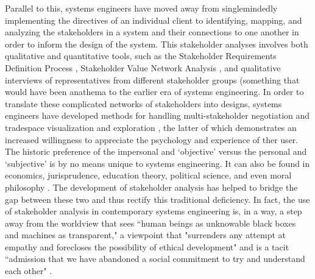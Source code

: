 \documentclass[notitlepage]{article}
\begin{document}
Parallel to this, systems engineers have moved away from singlemindedly implementing the directives of an individual client to identifying, mapping, and analyzing the stakeholders in a system and their connections to one another in order to inform the design of the system. This stakeholder analyses involves both qualitative and quantitative tools, such as the Stakeholder Requirements Definition Process \cite{incoseINCOSESystemsEngineering2015}, Stakeholder Value Network Analysis \cite{fengDependencyStructureMatrix2010a}, and qualitative interviews of representatives from different stakeholder groups (something that would have been anathema to the earlier era of systems engineering. In order to translate these complicated networks of stakeholders into designs, systems engineers have developed methods for handling multi-stakeholder negotiation and \cite{fitzgeraldEffectsEnhancedMultiparty2015,fitzgeraldRecommendationsFramingMultistakeholder2016,weckMULTISTAKEHOLDERSIMULATIONGAMING2012} tradespace visualization and exploration \cite{fitzgeraldEffectsEnhancedMultiparty2015,fitzgeraldRecommendationsFramingMultistakeholder2016,groganInteractiveModelsSystem2015,rossMultiAttributeTradespaceExploration2004,selvavaleroRulebasedSystemArchitecting2012},  the latter of which demonstrates an increased willingness to appreciate the psychology and experience of ther user. The historic preference of the impersonal and `objective' versus the personal and `subjective' is by no means unique to systems engineering. It can also be found in economics, jurisprudence, education theory, political science, and even moral philosophy \cite{banuriModernatizationItsDiscontents1990}. The development of stakeholder analysis has helped to bridge the gap between these two and thus rectify this traditional deficiency. In fact, the use of stakeholder analysis in contemporary systems engineering is, in a way, a step away from the worldview that sees ``human beings as unknowable black boxes and machines as transparent," a viewpoint that "surrenders any attempt at empathy and forecloses the possibility of ethical development" and is a tacit ``admission that we have abandoned a social commitment to try and understand each other" \cite{eubanksAutomatingInequalityHow2018}.
\end{document}
